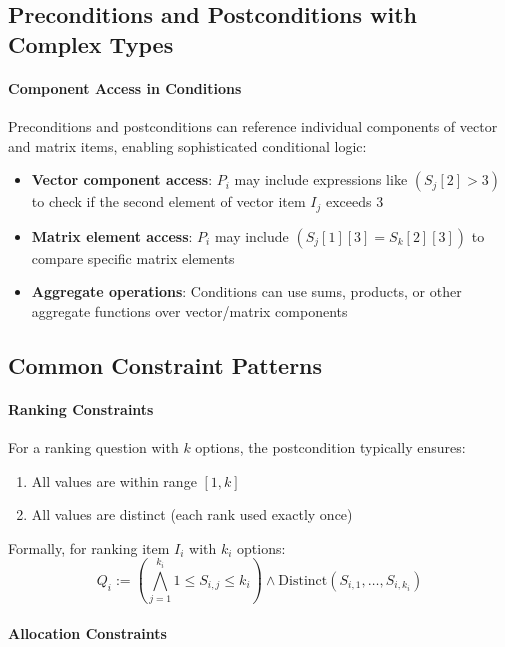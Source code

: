\subsection{Preconditions and Postconditions with Complex Types}

\paragraph{Component Access in Conditions}

Preconditions and postconditions can reference individual components of vector and matrix items, enabling sophisticated conditional logic:

\begin{itemize}
    \item \textbf{Vector component access}: $P_i$ may include expressions like $(S_j[2] > 3)$ to check if the second element of vector item $I_j$ exceeds 3
    \item \textbf{Matrix element access}: $P_i$ may include $(S_j[1][3] = S_k[2][3])$ to compare specific matrix elements
    \item \textbf{Aggregate operations}: Conditions can use sums, products, or other aggregate functions over vector/matrix components
\end{itemize}

\subsection{Common Constraint Patterns}

\paragraph{Ranking Constraints}

For a ranking question with $k$ options, the postcondition typically ensures:
\begin{enumerate}
    \item All values are within range $[1, k]$
    \item All values are distinct (each rank used exactly once)
\end{enumerate}

Formally, for ranking item $I_i$ with $k_i$ options:
\[
Q_i := \left(\bigwedge_{j=1}^{k_i} 1 \leq S_{i,j} \leq k_i\right) \land \text{Distinct}(S_{i,1}, \ldots, S_{i,k_i})
\]

\paragraph{Allocation Constraints}

